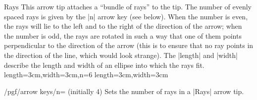 \begin{arrowtip}{Rays}
  {
    This arrow tip attaches a ``bundle of rays'' to the tip. The
    number of evenly spaced rays is given by the |n| arrow key (see
    below). When the number is even, the rays will lie to the left and
    to the right of the direction of the arrow; when the number is
    odd, the rays are rotated in such a way that one of them points
    perpendicular to the direction of the arrow (this is to ensure
    that no ray points in the direction of the line, which would look
    strange). The |length| and |width| describe the length and width
    of an ellipse into which the rays fit.
  }
  {length=3cm,width=3cm,n=6}
  {length=3cm,width=3cm}
  
  \begin{arrowexamples}
    \arrowexample[]
    \arrowexampledup[sep]
    \arrowexampledupdot[sep]
    \arrowexample[width'=0pt 2]
    \arrowexample[round]
    \arrowexample[n=2]
    \arrowexample[n=3]
    \arrowexample[n=4]
    \arrowexample[n=5]
    \arrowexample[n=6]
    \arrowexample[n=7]
    \arrowexample[n=8]
    \arrowexample[n=9]
    \arrowexample[slant=.3]
    \arrowexample[left]
    \arrowexample[right]
    \arrowexample[left,n=5]
    \arrowexample[right,n=5]
    \arrowexample[red]
  \end{arrowexamples}
\end{arrowtip}
\begin{key}{/pgf/arrow keys/n= (initially 4)}
  Sets the number of rays in a |Rays| arrow tip.
\end{key}


\endinput



